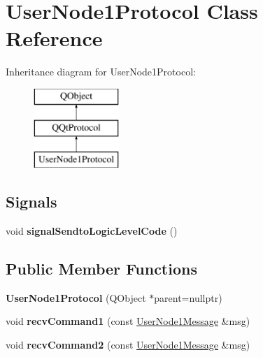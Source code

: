 \hypertarget{class_user_node1_protocol}{}\section{User\+Node1\+Protocol Class Reference}
\label{class_user_node1_protocol}
Inheritance diagram for User\+Node1\+Protocol\+:\begin{figure}[H]
\begin{center}
\leavevmode
\includegraphics[height=3.000000cm]{class_user_node1_protocol}
\end{center}
\end{figure}
\subsection*{Signals}
\begin{DoxyCompactItemize}
\item 
\mbox{\label{class_user_node1_protocol_a1f79cf6971b6d03ccaef888ed0fd4eff}} 
void {\bfseries signal\+Sendto\+Logic\+Level\+Code} ()
\end{DoxyCompactItemize}
\subsection*{Public Member Functions}
\begin{DoxyCompactItemize}
\item 
\mbox{\label{class_user_node1_protocol_adee070a2cd5a9e91a0c739b2c02fa303}} 
{\bfseries User\+Node1\+Protocol} (Q\+Object $\ast$parent=nullptr)
\item 
\mbox{\label{class_user_node1_protocol_acb8ded9a11569803338d5381532746f3}} 
void {\bfseries recv\+Command1} (const \mbox{\hyperlink{class_user_node1_message}{User\+Node1\+Message}} \&msg)
\item 
\mbox{\label{class_user_node1_protocol_a12e613fca3bf89f1a525a99bb94abe4f}} 
void {\bfseries recv\+Command2} (const \mbox{\hyperlink{class_user_node1_message}{User\+Node1\+Message}} \&msg)
\end{DoxyCompactItemize}
